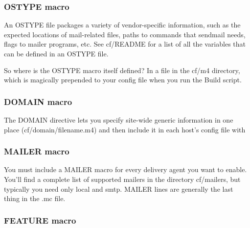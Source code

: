 
\subsubsection[{OSTYPE}
macro]{\texorpdfstring{\protect\hypertarget{part0026_split_034.htmlux5cux23_idTextAnchor1067}{}{}\protect\hypertarget{part0026_split_034.htmlux5cux23_idIndexMarker2515}{}{}{OSTYPE}
macro}{OSTYPE macro}}

An {OSTYPE} file packages a variety of vendor-specific information, such
as the expected locations of mail-related files, paths to commands that
{sendmail} needs, flags to mailer programs, etc. See {cf/README} for a
list of all the variables that can be defined in an {OSTYPE} file.

So where is the {OSTYPE} macro itself defined? In a file in the {cf/m4}
directory, which is magically prepended to your config file when you run
the {Build} script.

\subsubsection[{DOMAIN}
macro]{\texorpdfstring{\protect\hypertarget{part0026_split_034.htmlux5cux23_idTextAnchor1068}{}{}\protect\hypertarget{part0026_split_034.htmlux5cux23_idIndexMarker2516}{}{}{DOMAIN}
macro}{DOMAIN macro}}

The {DOMAIN} directive lets you specify site-wide generic information in
one place ({cf/domain/}{filename}{.m4}) and then include it in each
host's config file with


\subsubsection[
macro]{\texorpdfstring{{MAI\protect\hypertarget{part0026_split_034.htmlux5cux23_idTextAnchor1069}{}{}LER}
macro}{MAILER macro}}

You must include a {MAILER} macro for every delivery agent you want to
enable. You'll find a complete list of supported mailers in the
directory {cf/mailers}, but typically you need only {local }and{ smtp}.
{MAILER} lines are generally the last thing in the {.mc} file.

\subsubsection[
macro]{\texorpdfstring{\protect\hypertarget{part0026_split_034.htmlux5cux23_idTextAnchor1070}{}{}\protect\hypertarget{part0026_split_034.htmlux5cux23_idIndexMarker2517}{}{}{FEAT\protect\hypertarget{part0026_split_034.htmlux5cux23_idTextAnchor1071}{}{}URE}
macro}{FEATURE macro}}

